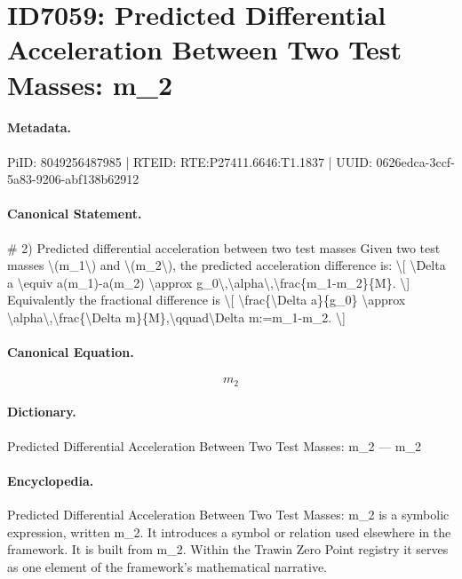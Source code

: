 \section*{ID7059: Predicted Differential Acceleration Between Two Test Masses: m\_2}
\paragraph{Metadata.}
PiID: 8049256487985 | RTEID: RTE:P27411.6646:T1.1837 | UUID: 0626edca-3ccf-5a83-9206-abf138b62912

\paragraph{Canonical Statement.}
\# 2) Predicted differential acceleration between two test masses Given two test masses \textbackslash{}(m\_1\textbackslash{}) and \textbackslash{}(m\_2\textbackslash{}), the predicted acceleration difference is: \textbackslash{}[ \textbackslash{}Delta a \textbackslash{}equiv a(m\_1)-a(m\_2) \textbackslash{}approx g\_0\textbackslash{},\textbackslash{}alpha\textbackslash{},\textbackslash{}frac\{m\_1-m\_2\}\{M\}. \textbackslash{}] Equivalently the fractional difference is \textbackslash{}[ \textbackslash{}frac\{\textbackslash{}Delta a\}\{g\_0\} \textbackslash{}approx \textbackslash{}alpha\textbackslash{},\textbackslash{}frac\{\textbackslash{}Delta m\}\{M\},\textbackslash{}qquad\textbackslash{}Delta m:=m\_1-m\_2. \textbackslash{}]

\paragraph{Canonical Equation.}
\[
m_2
\]

\paragraph{Dictionary.}
Predicted Differential Acceleration Between Two Test Masses: m\_2 — m\_2

\paragraph{Encyclopedia.}
Predicted Differential Acceleration Between Two Test Masses: m\_2 is a symbolic expression, written m\_2. It introduces a symbol or relation used elsewhere in the framework. It is built from m\_2. Within the Trawin Zero Point registry it serves as one element of the framework's mathematical narrative.
